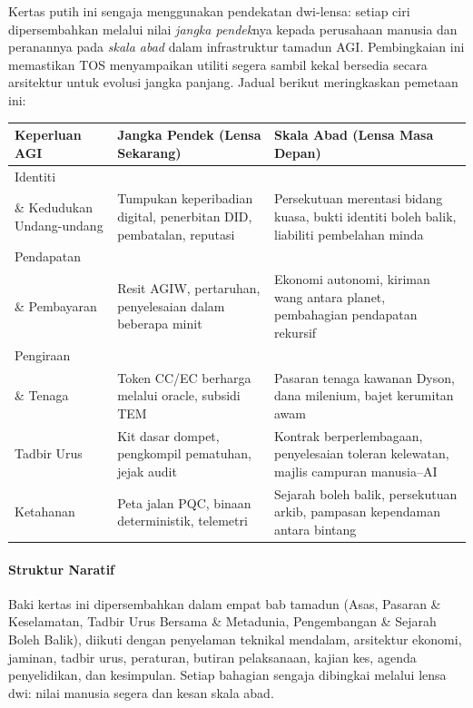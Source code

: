 \documentclass[11pt]{article}
\begin{document}
Kertas putih ini sengaja menggunakan pendekatan dwi-lensa: setiap ciri dipersembahkan melalui nilai \emph{jangka pendek}nya kepada perusahaan manusia dan peranannya pada \emph{skala abad} dalam infrastruktur tamadun AGI. Pembingkaian ini memastikan TOS menyampaikan utiliti segera sambil kekal bersedia secara arsitektur untuk evolusi jangka panjang. Jadual berikut meringkaskan pemetaan ini:

\begin{longtable}{@{}p{}p{}p{}@{}}
\toprule
\textbf{Keperluan AGI} & \textbf{Jangka Pendek (Lensa Sekarang)} & \textbf{Skala Abad (Lensa Masa Depan)} \\\midrule
Identiti \\ \& Kedudukan Undang-undang & Tumpukan keperibadian digital, penerbitan DID, pembatalan, reputasi & Persekutuan merentasi bidang kuasa, bukti identiti boleh balik, liabiliti pembelahan minda \\
Pendapatan \\ \& Pembayaran & Resit AGIW, pertaruhan, penyelesaian dalam beberapa minit & Ekonomi autonomi, kiriman wang antara planet, pembahagian pendapatan rekursif \\
Pengiraan \\ \& Tenaga & Token CC/EC berharga melalui oracle, subsidi TEM & Pasaran tenaga kawanan Dyson, dana milenium, bajet kerumitan awam \\
Tadbir Urus & Kit dasar dompet, pengkompil pematuhan, jejak audit & Kontrak berperlembagaan, penyelesaian toleran kelewatan, majlis campuran manusia--AI \\
Ketahanan & Peta jalan PQC, binaan deterministik, telemetri & Sejarah boleh balik, persekutuan arkib, pampasan kependaman antara bintang \\\bottomrule
\end{longtable}

\paragraph{Struktur Naratif} Baki kertas ini dipersembahkan dalam empat bab tamadun (Asas, Pasaran \& Keselamatan, Tadbir Urus Bersama \& Metadunia, Pengembangan \& Sejarah Boleh Balik), diikuti dengan penyelaman teknikal mendalam, arsitektur ekonomi, jaminan, tadbir urus, peraturan, butiran pelaksanaan, kajian kes, agenda penyelidikan, dan kesimpulan. Setiap bahagian sengaja dibingkai melalui lensa dwi: nilai manusia segera dan kesan skala abad.
\end{document}
